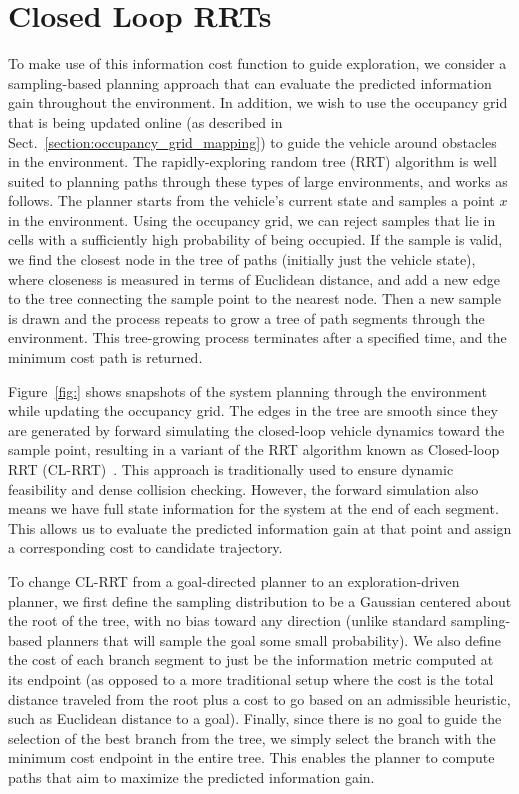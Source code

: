 \section{Closed Loop RRTs}
\label{sec:planner}

To make use of this information cost function to guide exploration, we consider a sampling-based planning approach that can evaluate the predicted information gain throughout the environment. In addition, we wish to use the occupancy grid that is being updated online (as described in Sect.~\ref{section:occupancy_grid_mapping}) to guide the vehicle around obstacles in the environment. The rapidly-exploring random tree (RRT) algorithm is well suited to planning paths through these types of large environments, and works as follows.
The planner starts from the vehicle's current state and samples a point $x$ in the environment. Using the occupancy grid, we can reject samples that lie in cells with a sufficiently high probability of being occupied. If the sample is valid, we find the closest node in the tree of paths (initially just the vehicle state), where closeness is measured in terms of Euclidean distance, and add a new edge to the tree connecting the sample point to the nearest node.
Then a new sample is drawn and the process repeats to grow a tree of path segments through the environment. This tree-growing process terminates after a specified time, and the minimum cost path is returned.

Figure~\ref{fig:} shows snapshots of the system planning through the environment while updating the occupancy grid. The edges in the tree are smooth since they are generated by forward simulating the closed-loop vehicle dynamics toward the sample point, resulting in a variant of the RRT algorithm known as Closed-loop RRT (CL-RRT)~\cite{Kuwata09_TCST}. This approach is traditionally used to ensure dynamic feasibility and dense collision checking. However, the forward simulation also means we have full state information for the system at the end of each segment. This allows us to evaluate the predicted information gain at that point and assign a corresponding cost to candidate trajectory.

To change CL-RRT from a goal-directed planner to an exploration-driven planner, we first define the sampling distribution to be a Gaussian centered about the root of the tree, with no bias toward any direction (unlike standard sampling-based planners that will sample the goal some small probability). We also define the cost of each branch segment to just be the information metric computed at its endpoint (as opposed to a more traditional setup where the cost is the total distance traveled from the root plus a cost to go based on an admissible heuristic, such as Euclidean distance to a goal). Finally, since there is no goal to guide the selection of the best branch from the tree, we simply select the branch with the minimum cost endpoint in the entire tree. This enables the planner to compute paths that aim to maximize the predicted information gain.

